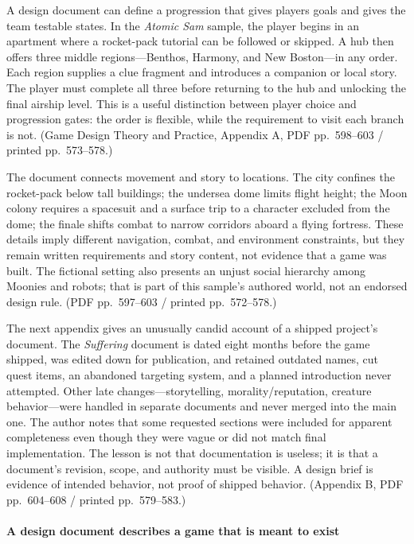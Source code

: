 A design document can define a progression that gives players goals and gives the team testable states. In the \emph{Atomic Sam} sample, the player begins in an apartment where a rocket-pack tutorial can be followed or skipped. A hub then offers three middle regions---Benthos, Harmony, and New Boston---in any order. Each region supplies a clue fragment and introduces a companion or local story. The player must complete all three before returning to the hub and unlocking the final airship level. This is a useful distinction between player choice and progression gates: the order is flexible, while the requirement to visit each branch is not. (Game Design Theory and Practice, Appendix A, PDF pp.~598--603 / printed pp.~573--578.)

The document connects movement and story to locations. The city confines the rocket-pack below tall buildings; the undersea dome limits flight height; the Moon colony requires a spacesuit and a surface trip to a character excluded from the dome; the finale shifts combat to narrow corridors aboard a flying fortress. These details imply different navigation, combat, and environment constraints, but they remain written requirements and story content, not evidence that a game was built. The fictional setting also presents an unjust social hierarchy among Moonies and robots; that is part of this sample's authored world, not an endorsed design rule. (PDF pp.~597--603 / printed pp.~572--578.)

The next appendix gives an unusually candid account of a shipped project's document. The \emph{Suffering} document is dated eight months before the game shipped, was edited down for publication, and retained outdated names, cut quest items, an abandoned targeting system, and a planned introduction never attempted. Other late changes---storytelling, morality/reputation, creature behavior---were handled in separate documents and never merged into the main one. The author notes that some requested sections were included for apparent completeness even though they were vague or did not match final implementation. The lesson is not that documentation is useless; it is that a document's revision, scope, and authority must be visible. A design brief is evidence of intended behavior, not proof of shipped behavior. (Appendix B, PDF pp.~604--608 / printed pp.~579--583.)

\paragraph{A design document describes a game that is meant to exist}\label{05-engine-i-ch009-a-design-document-describes-a-game-that-is-meant-to-exist}

